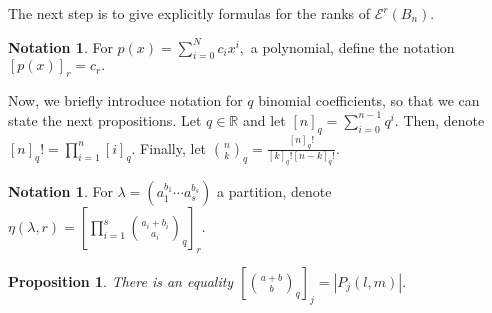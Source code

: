 \documentclass[10 pt]{amsart}
\theoremstyle{plain}
\newtheorem{prop}[thm]{Proposition}
\theoremstyle{definition}
\newtheorem{note}[thm]{Notation}
\theoremstyle{remark}
\numberwithin{equation}{section}
\newcommand\BR{{\mathbb R}}
\begin{document}
The next step is to give explicitly formulas for the ranks of $\mathcal E^r(B_n).$

\begin{note}
For $p(x) = \sum_{i=0}^N c_ix^i,$ a polynomial, define the notation $[p(x)]_r = c_r.$
\end{note}

Now, we briefly introduce notation for $q$ binomial coefficients, so that we can state the next propositions. Let $q \in \BR$ and let $[n]_q = \sum_{i=0}^{n-1} q^i.$ Then, denote $[n]_q! = \prod_{i=1}^n [i]_q.$ Finally, let $\binom n k_q = \frac{[n]_q!}{[k]_q![n-k]_q!}.$

\begin{note}
For $\lambda = (a_1^{b_1} \cdots a_s^{b_s})$ a partition, denote $\eta(\lambda,r) = \left[\prod_{i=1}^s \binom{a_i+b_i}{a_i}_q\right]_r.$
\end{note}

\begin{prop}
\cite[Proposition 1.3.19]{enumerative_comb}
\label{prop:counting_box_partitions}
There is an equality $[\binom {a+b} b_q]_j = |P_j(l,m)|.$
\end{prop}
\end{document}
